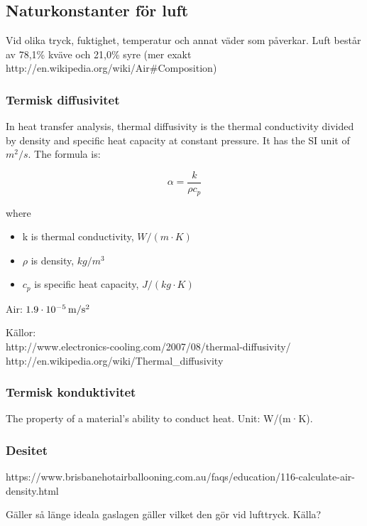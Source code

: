\subsection{Naturkonstanter för luft}

Vid olika tryck, fuktighet, temperatur och annat väder som påverkar. Luft består av 78,1\% kväve och 21,0\% syre (mer exakt http://en.wikipedia.org/wiki/Air\#Composition)

\subsubsection{Termisk diffusivitet}
In heat transfer analysis, thermal diffusivity is the thermal conductivity divided by density and specific heat capacity at constant pressure. It has the SI unit of $m^2/s$. The formula is:

\begin{equation}
\alpha=\frac{k}{\rho c_p}
\end{equation}

where
\begin{itemize}
   \item[] k is thermal conductivity, $\unit{W/(m·K)}$
   \item[] $\rho$ is density, $\unit{kg/m^3}$
   \item[] $c_p$ is specific heat capacity, $\unit{J/(kg·K)}$
\end{itemize}

Air: $\unit[1.9\cdot10^{-5}]{m/s^2}$

Källor:\\
http://www.electronics-cooling.com/2007/08/thermal-diffusivity/\\
http://en.wikipedia.org/wiki/Thermal\_diffusivity\\

\subsubsection{Termisk konduktivitet}
The property of a material's ability to conduct heat. Unit: W/(m·K).

\subsubsection{Desitet}

https://www.brisbanehotairballooning.com.au/faqs/education/116-calculate-air-density.html

Gäller så länge ideala gaslagen gäller vilket den gör vid lufttryck. Källa?




